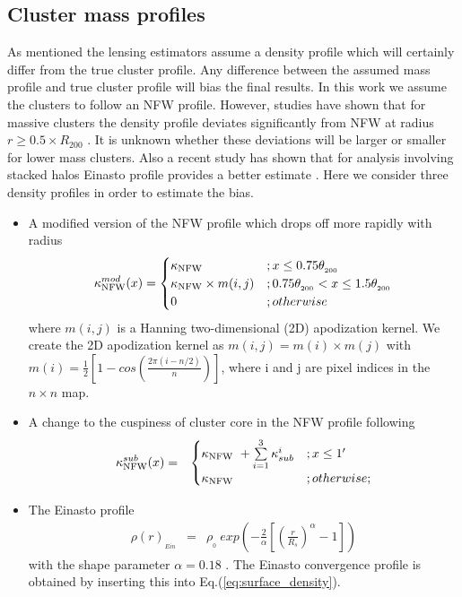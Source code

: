 \subsection{Cluster mass profiles}
\label{sec_den_profiles}
As mentioned the lensing estimators assume a density profile which will certainly differ from the true cluster profile. 
Any difference between the assumed mass profile and true cluster profile will bias the final results.
In this work we assume the clusters to follow an NFW profile. 
However, studies have shown that for massive clusters the density profile deviates significantly from NFW at radius $r \ge 0.5 \times R_{200}$ \citep{diemer14}. 
It is unknown whether these deviations will be larger or smaller for lower mass clusters.
Also a recent study has shown that for analysis involving stacked halos Einasto profile \citep{einasto89} provides a better estimate \citep{child18}.
Here we consider three density profiles in order to estimate the bias.
\begin{itemize}
\item A modified version of the NFW profile which drops off more rapidly with radius
\begin{eqnarray}
\kappa_{\rm NFW}^{mod}(x) =
\begin{cases}
    \kappa_{\rm NFW} &; x \le 0.75\theta_{_{200}}\\
    \kappa_{\rm NFW} \times m(i,j)&; 0.75\theta_{_{200}} < x \le 1.5\theta_{_{200}}\\
    0 &; otherwise
\label{eq_kappa_mod}
\end{cases}
\end{eqnarray}
where $m(i,j)$ is a Hanning two-dimensional (2D) apodization kernel.
We create the 2D apodization kernel as $m(i,j) = m(i) \times m(j)$ with $m(i) = \frac{1}{2} \left[ 1 - cos\left(\frac{2\pi  (i-n/2) }{n} \right)\right]$, where i and j are pixel indices in the $n \times n$ map.
\item A change to the cuspiness of cluster core in the NFW profile following \citet{king01} 
\begin{eqnarray}
\kappa_{\rm NFW}^{sub}(x)  & =  &
\begin{cases}
    \kappa_{\rm NFW}\ + \sum\limits_{i=1}^{3} \kappa_{sub}^{i}&; x \le 1'\\
    \kappa_{\rm NFW} &; otherwise;
\label{eq_kappa_sub}
\end{cases}
\end{eqnarray}
\item The Einasto profile \citep{einasto89}
\begin{eqnarray}
\rho(r)_{_{Ein}} & = &  \rho_{_{0}}\ exp\left( - \frac{2}{\alpha} \left[\left(\frac{r}{R_s} \right)^{\alpha} - 1\right]\right)
\label{eq_einasto_density}
\end{eqnarray}
with the shape parameter $\alpha = 0.18$ \citep{ludlow13}. The Einasto convergence profile is obtained by inserting this into Eq.(\ref{eq:surface_density}).
\end{itemize}
 
